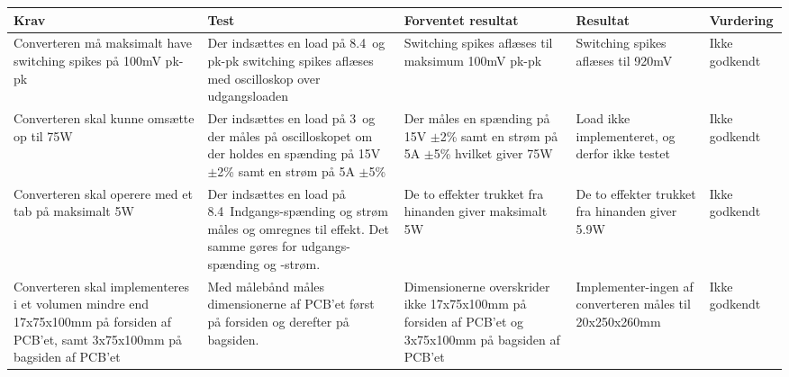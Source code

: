 \begin{tabularx}{\textwidth}{|X|X|X|X|X|}
	\hline
	\textbf{Krav} & \textbf{Test} & \textbf{Forventet resultat} & \textbf{Resultat} & \textbf{Vurdering} \\ \hline
	Converteren må maksimalt have switching spikes på 100mV pk-pk & Der indsættes en load på 8.4\ohm\ og pk-pk switching spikes aflæses med oscilloskop over udgangsloaden & Switching spikes aflæses til maksimum 100mV pk-pk & Switching spikes aflæses til 920mV & Ikke godkendt \\ \hline
	Converteren skal kunne omsætte op til 75W & Der indsættes en load på 3\ohm\ og der måles på oscilloskopet om der holdes en spænding på 15V $\pm$2\% samt en strøm på 5A $\pm$5\% & Der måles en spænding på 15V $\pm$2\% samt en strøm på 5A $\pm$5\% hvilket giver 75W & Load ikke implementeret, og derfor ikke testet & Ikke godkendt \\ \hline
	Converteren skal operere med et tab på maksimalt 5W & Der indsættes en load på 8.4\ohm\ Indgangs-spænding og strøm måles og omregnes til effekt. Det samme gøres for udgangs-spænding og -strøm. & De to effekter trukket fra hinanden giver maksimalt 5W & De to effekter trukket fra hinanden giver 5.9W & Ikke godkendt \\ \hline 
	Converteren skal implementeres i et volumen mindre end 17x75x100mm på forsiden af PCB'et, samt 3x75x100mm på bagsiden af PCB'et & Med målebånd måles dimensionerne af PCB'et først på forsiden og derefter på bagsiden. & Dimensionerne overskrider ikke 17x75x100mm på forsiden af PCB'et og 3x75x100mm på bagsiden af PCB'et & Implementer-ingen af converteren måles til 20x250x260mm & Ikke godkendt \\ \hline
	
\end{tabularx}



